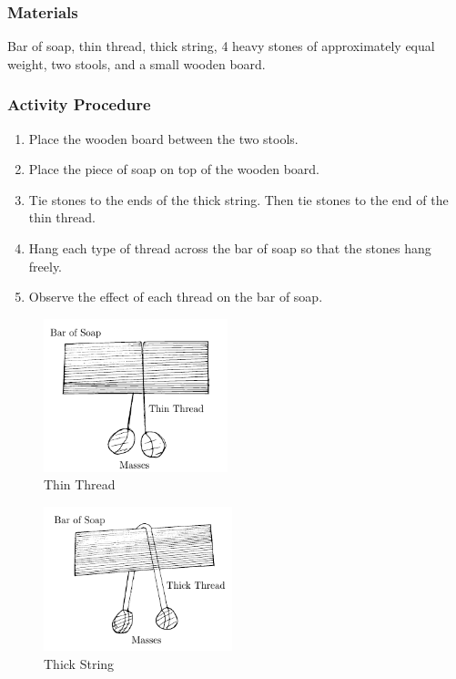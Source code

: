 \subsubsection*{Materials}
Bar of soap, thin thread, thick string, 4 heavy stones of approximately equal weight, two stools, and a small wooden board.

\subsubsection*{Activity Procedure}
\begin{enumerate}
\item{Place the wooden board between the two stools.}
\item{Place the piece of soap on top of the wooden board. }
\item{Tie stones to the ends of the thick string. Then tie stones to the end of the thin thread.} 
\item{Hang each type of thread across the bar of soap so that the stones hang freely.} 
\item{Observe the effect of each thread on the bar of soap.} 
\end{enumerate}

\begin{figure}
\begin{center}
\includegraphics{./img/pressure-solid1.png}
\caption{Thin Thread}
\label{fig:pressure-solid1}
\end{center}
\end{figure}

\begin{figure}
\begin{center}
\includegraphics{./img/pressure-solid2.png}
\caption{Thick String}
\label{fig:pressure-solid2}
\end{center}
\end{figure}

